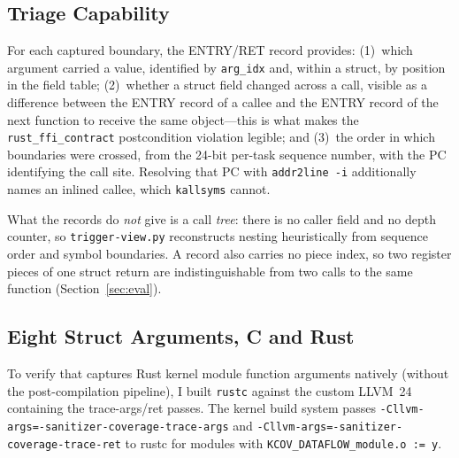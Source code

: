\documentclass{article}
\begin{document}
\subsection{Triage Capability}

For each captured boundary, the ENTRY/RET record provides: (1)~which argument
carried a value, identified by \texttt{arg\_idx} and, within a struct, by
position in the field table; (2)~whether a struct field changed across a call,
visible as a difference between the ENTRY record of a callee and the ENTRY
record of the next function to receive the same object---this is what makes the
\texttt{rust\_ffi\_contract} postcondition violation legible; and (3)~the order
in which boundaries were crossed, from the 24-bit per-task sequence number, with
the PC identifying the call site. Resolving that PC with \texttt{addr2line -i}
additionally names an inlined callee, which \texttt{kallsyms} cannot.

What the records do \emph{not} give is a call \emph{tree}: there is no caller
field and no depth counter, so \texttt{trigger-view.py} reconstructs nesting
heuristically from sequence order and symbol boundaries. A record also carries
no piece index, so two register pieces of one struct return are
indistinguishable from two calls to the same function
(Section~\ref{sec:eval}).

\subsection{Eight Struct Arguments, C and Rust}

To verify that \toolname{} captures Rust kernel module function arguments
natively (without the post-compilation pipeline), I built \texttt{rustc}
against the custom LLVM~24 containing the trace-args/ret passes. The kernel
build system passes \texttt{-Cllvm-args=-sanitizer-coverage-trace-args}
and \texttt{-Cllvm-args=-sanitizer-coverage-trace-ret} to rustc for modules
with \texttt{KCOV\_DATAFLOW\_module.o := y}.
\end{document}
